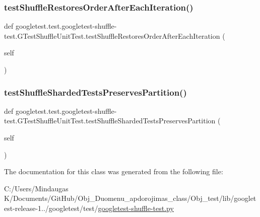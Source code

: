 \subsubsection{\texorpdfstring{testShuffleRestoresOrderAfterEachIteration()}{testShuffleRestoresOrderAfterEachIteration()}}
{\footnotesize\ttfamily def googletest.\+test.\+googletest-\/shuffle-\/test.\+G\+Test\+Shuffle\+Unit\+Test.\+test\+Shuffle\+Restores\+Order\+After\+Each\+Iteration (\begin{DoxyParamCaption}\item[{}]{self }\end{DoxyParamCaption})}

\mbox{\label{classgoogletest_1_1test_1_1googletest-shuffle-test_1_1_g_test_shuffle_unit_test_a4f74f11df1fcd7be4911788fae7dee66}} 
\subsubsection{\texorpdfstring{testShuffleShardedTestsPreservesPartition()}{testShuffleShardedTestsPreservesPartition()}}
{\footnotesize\ttfamily def googletest.\+test.\+googletest-\/shuffle-\/test.\+G\+Test\+Shuffle\+Unit\+Test.\+test\+Shuffle\+Sharded\+Tests\+Preserves\+Partition (\begin{DoxyParamCaption}\item[{}]{self }\end{DoxyParamCaption})}



The documentation for this class was generated from the following file\+:\begin{DoxyCompactItemize}
\item 
C\+:/\+Users/\+Mindaugas K/\+Documents/\+Git\+Hub/\+Obj\+\_\+\+Duomenu\+\_\+apdorojimas\+\_\+class/\+Obj\+\_\+test/lib/googletest-\/release-\/1../googletest/test/\mbox{\hyperlink{_obj__test_2lib_2googletest-release-1_88_81_2googletest_2test_2googletest-shuffle-test_8py}{googletest-\/shuffle-\/test.\+py}}\end{DoxyCompactItemize}
